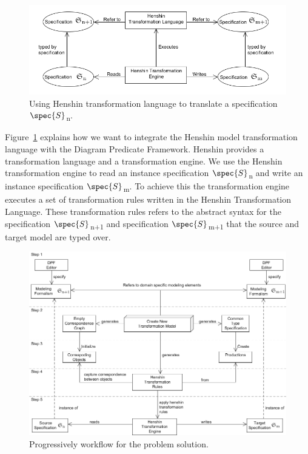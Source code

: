 \begin{figure}[H]
	\centering
	\includegraphics[scale=0.7]{./Figures/TransformationSolutionBasic.png}
	\caption[Integrating Henshin with DPF]
	{Using Henshin transformation language to translate a specification
	$\spec{S}$\textsubscript{n}.}
	\label{fig:Simple_Solution}
\end{figure}


Figure~\ref{fig:Simple_Solution} explains how we want to integrate the Henshin
model transformation language with the Diagram Predicate Framework. Henshin
provides a transformation language and a transformation engine. We
use the Henshin transformation engine to read an instance specification
$\spec{S}$\textsubscript{n} and write an instance specification
$\spec{S}$\textsubscript{m}. To achieve this the transformation engine executes
a set of transformation rules written in the Henshin Transformation Language.
These transformation rules refers to the abstract syntax for the
specification $\spec{S}$\textsubscript{n+1} and specification
$\spec{S}$\textsubscript{m+1} that the source and target model are typed over.


\begin{figure}[H]
	\centering
	\includegraphics[scale=0.65]{./Figures/flowchart_v2.png}
	\caption[Work flow for the solution]
	{Progressively workflow for the problem solution.}
	\label{fig:work_flow_solution}
\end{figure}

